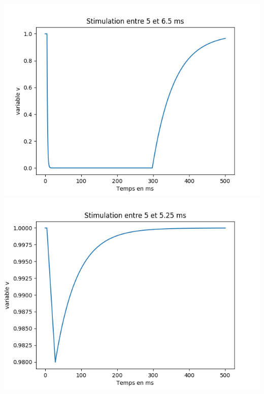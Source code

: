 \documentclass[a4paper,12pt,twoside]{report}
\begin{document}
\includegraphics[scale=0.5]{./v(t).png}\\
\includegraphics[scale=0.5]{./v(t)_2.png}\\
\end{document}

